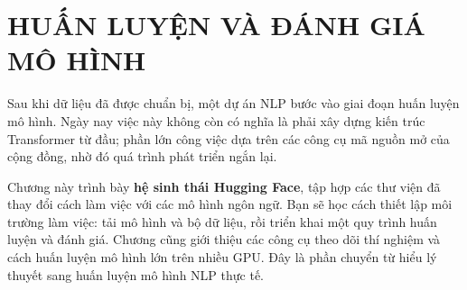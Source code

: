 
\chapter{HUẤN LUYỆN VÀ ĐÁNH GIÁ MÔ HÌNH}
\label{chap:model_training_evaluation}

Sau khi dữ liệu đã được chuẩn bị, một dự án NLP bước vào giai đoạn huấn luyện mô hình. Ngày nay việc này không còn có nghĩa là phải xây dựng kiến trúc Transformer từ đầu; phần lớn công việc dựa trên các công cụ mã nguồn mở của cộng đồng, nhờ đó quá trình phát triển ngắn lại.

Chương này trình bày \textbf{hệ sinh thái Hugging Face}, tập hợp các thư viện đã thay đổi cách làm việc với các mô hình ngôn ngữ. Bạn sẽ học cách thiết lập môi trường làm việc: tải mô hình và bộ dữ liệu, rồi triển khai một quy trình huấn luyện và đánh giá. Chương cũng giới thiệu các công cụ theo dõi thí nghiệm và cách huấn luyện mô hình lớn trên nhiều GPU. Đây là phần chuyển từ hiểu lý thuyết sang huấn luyện mô hình NLP thực tế.